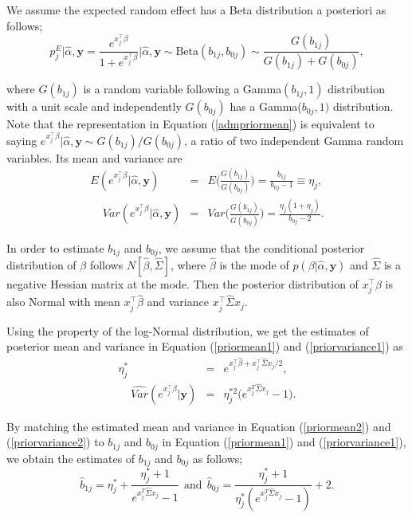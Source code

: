 \documentclass[article]{jss}
\begin{document}
We assume the expected random effect has a Beta distribution a posteriori as follows;
\begin{equation}\label{admpriormean}
p^E_{j}\vert\hat{\alpha}, \boldsymbol{y}=\frac{e^{x_j^\top\beta}}{1+e^{x_j^\top\beta}}\bigg\vert\hat{\alpha}, \boldsymbol{y}\sim \textrm{Beta}(b_{1j}, b_{0j})\sim \frac{G(b_{1j})}{G(b_{1j})+G(b_{0j})},
\end{equation}

where $G(b_{1j})$ is a random variable following a Gamma$(b_{1j}, 1)$ distribution with a unit scale and independently $G(b_{0j})$ has a Gamma($b_{0j}, 1)$ distribution.  Note that the representation in Equation (\ref{admpriormean}) is equivalent to saying $e^{x_j^\top\beta}\vert\hat{\alpha}, \boldsymbol{y}\sim G(b_{1j})/G(b_{0j})$, a ratio of two independent Gamma random variables. Its mean and variance are
\begin{eqnarray}
E(e^{x_j^\top\beta}\vert\hat{\alpha}, \boldsymbol{y})&=&E\bigg(\frac{G(b_{1j})}{G(b_{0j})}\bigg)=\frac{b_{1j}}{b_{0j}-1}\equiv\eta_j,\label{priormean1}\\
~~~~~Var(e^{x_j^\top\beta}\vert\hat{\alpha}, \boldsymbol{y})&=&Var\bigg(\frac{G(b_{1j})}{G(b_{0j})}\bigg)=\frac{\eta_j(1+\eta_j)}{b_{0j}-2}.\label{priorvariance1}
\end{eqnarray}

In order to estimate $b_{1j}$ and $b_{0j}$, we assume that the conditional posterior distribution of $\beta$ follows $N[\hat{\beta}, \hat{\Sigma}]$, where $\hat{\beta}$ is the mode of $p(\beta\vert \hat{\alpha}, \boldsymbol{y})$  and $\hat{\Sigma}$ is a negative Hessian matrix at the mode. Then the posterior distribution of $x_j^\top\beta$ is also Normal with mean $x_j^\top\hat{\beta}$ and variance $x_j^\top\hat{\Sigma} x_j$.

Using the property of the log-Normal distribution, we get the estimates of posterior mean and variance in Equation (\ref{priormean1}) and (\ref{priorvariance1}) as
\begin{eqnarray}
\eta^\ast_j&=&e^{x_j^\top\hat{\beta}+x_j^\top\hat{\Sigma} x_j/2},\label{priormean2}\\
~~~~~\widehat{Var}(e^{x_j^\top\beta}\vert\boldsymbol{y})&=&\eta^{\ast 2}_j\big(e^{x_j^{T}\hat{\Sigma} x_j}-1\big).\label{priorvariance2}
\end{eqnarray}

By matching the estimated mean and variance in Equation (\ref{priormean2}) and (\ref{priorvariance2}) to $b_{1j}$ and $b_{0j}$ in Equation (\ref{priormean1}) and (\ref{priorvariance1}), we obtain the estimates of $b_{1j}$ and $b_{0j}$ as follows;
\begin{equation}\label{priormeanpara}
\hat{b}_{1j}=\eta^\ast_j+\frac{\eta^\ast_j + 1}{e^{x_j^{T}\hat{\Sigma} x_j}-1}~~\textrm{and}~~\hat{b}_{0j}=\frac{\eta^\ast_j + 1}{\eta^\ast_j(e^{x_j^{T}\hat{\Sigma} x_j}-1)}+2.
\end{equation}
\end{document}
